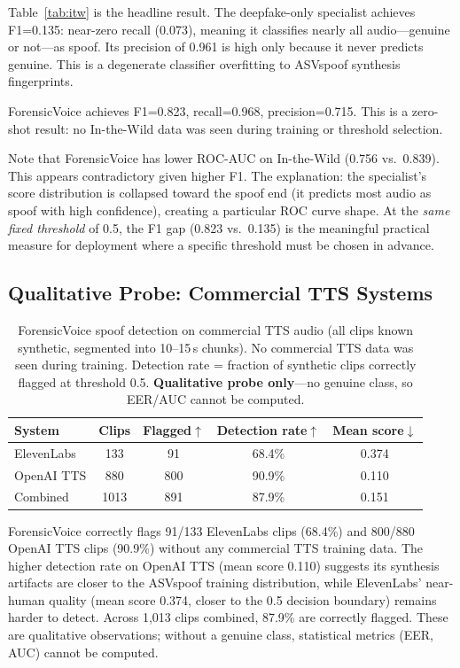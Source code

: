 \documentclass{article}
\newcommand{\fv}{ForensicVoice}
\begin{document}
Table~\ref{tab:itw} is the headline result. The deepfake-only specialist
achieves F1=0.135: near-zero recall (0.073), meaning it classifies nearly all
audio---genuine or not---as spoof. Its precision of 0.961 is high only because
it never predicts genuine. This is a degenerate classifier overfitting to
ASVspoof synthesis fingerprints.

\fv{} achieves F1=0.823, recall=0.968, precision=0.715. This is a zero-shot
result: no In-the-Wild data was seen during training or threshold selection.

Note that \fv{} has lower ROC-AUC on In-the-Wild (0.756 vs.\ 0.839). This
appears contradictory given higher F1. The explanation: the specialist's score
distribution is collapsed toward the spoof end (it predicts most audio as
spoof with high confidence), creating a particular ROC curve shape. At the
\emph{same fixed threshold} of 0.5, the F1 gap (0.823 vs.\ 0.135) is the
meaningful practical measure for deployment where a specific threshold must be
chosen in advance.

\subsection{Qualitative Probe: Commercial TTS Systems}

\begin{table}[t]
  \caption{
    \fv{} spoof detection on commercial TTS audio (all clips known synthetic,
    segmented into 10--15\,s chunks). No commercial TTS data was seen during
    training. Detection rate = fraction of synthetic clips correctly flagged
    at threshold 0.5. \textbf{Qualitative probe only}---no genuine class,
    so EER/AUC cannot be computed.
  }
  \label{tab:elevenlabs}
  \centering
  \small
  \begin{tabular}{lcccc}
    \toprule
    \textbf{System} & \textbf{Clips} & \textbf{Flagged}$\uparrow$
      & \textbf{Detection rate}$\uparrow$ & \textbf{Mean score}$\downarrow$ \\
    \midrule
    ElevenLabs  &  133 &  91 & 68.4\% & 0.374 \\
    OpenAI TTS  &  880 & 800 & 90.9\% & 0.110 \\
    \midrule
    Combined    & 1013 & 891 & 87.9\% & 0.151 \\
    \bottomrule
  \end{tabular}
\end{table}

\fv{} correctly flags 91/133 ElevenLabs clips (68.4\%) and 800/880 OpenAI TTS
clips (90.9\%) without any commercial TTS training data. The higher detection
rate on OpenAI TTS (mean score 0.110) suggests its synthesis artifacts are
closer to the ASVspoof training distribution, while ElevenLabs' near-human
quality (mean score 0.374, closer to the 0.5 decision boundary) remains harder
to detect. Across 1{,}013 clips combined, 87.9\% are correctly flagged.
These are qualitative observations; without a genuine class, statistical
metrics (EER, AUC) cannot be computed.
\end{document}
